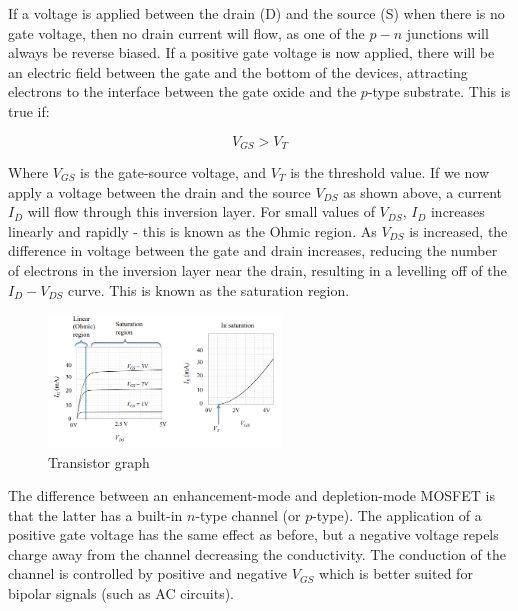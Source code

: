 \documentclass{article}
\begin{document}
If a voltage is applied between the drain (D) and the source (S) when there is no gate voltage, then no drain current will flow, as one of the $p-n$ junctions will always be reverse biased. If a positive gate voltage is now applied, there will be an electric field between the gate and the bottom of the devices, attracting electrons to the interface between the gate oxide and the $p$-type substrate. This is true if:

\[ V_{GS} > V_T \]

Where $V_{GS}$ is the gate-source voltage, and $V_T$ is the threshold value. If we now apply a voltage between the drain and the source $V_{DS}$ as shown above, a current $I_D$ will flow through this inversion layer. For small values of $V_{DS}$, $I_D$ increases linearly and rapidly - this is known as the Ohmic region. As $V_{DS}$ is increased, the difference in voltage between the gate and drain increases, reducing the number of electrons in the inversion layer near the drain, resulting in a levelling off of the $I_D - V_{DS}$ curve. This is known as the saturation region.

\begin{figure}[h]
    \centering
    \includegraphics[width = 0.55\textwidth]{images/fet2.png}
    \caption{Transistor graph}
    \label{fig:fet2}
\end{figure}

The difference between an enhancement-mode and depletion-mode MOSFET is that the latter has a built-in $n$-type channel (or $p$-type). The application of a positive gate voltage has the same effect as before, but a negative voltage repels charge away from the channel decreasing the conductivity. The conduction of the channel is controlled by positive and negative $V_{GS}$ which is better suited for bipolar signals (such as AC circuits).
\end{document}
